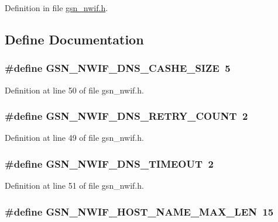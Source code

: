 Definition in file \hyperlink{a00534_source}{gsn\_\-nwif.h}.



\subsection{Define Documentation}
\hypertarget{a00534_af8b27c58acd985898926d6fe0b6cfb3e}{
\subsubsection[{GSN\_\-NWIF\_\-DNS\_\-CASHE\_\-SIZE}]{\setlength{\rightskip}{0pt plus 5cm}\#define GSN\_\-NWIF\_\-DNS\_\-CASHE\_\-SIZE~5}}
\label{a00534_af8b27c58acd985898926d6fe0b6cfb3e}


Definition at line 50 of file gsn\_\-nwif.h.

\hypertarget{a00534_a96d191e78da08d8ea8ae4b6bfee9fb97}{
\subsubsection[{GSN\_\-NWIF\_\-DNS\_\-RETRY\_\-COUNT}]{\setlength{\rightskip}{0pt plus 5cm}\#define GSN\_\-NWIF\_\-DNS\_\-RETRY\_\-COUNT~2}}
\label{a00534_a96d191e78da08d8ea8ae4b6bfee9fb97}


Definition at line 49 of file gsn\_\-nwif.h.

\hypertarget{a00534_ae1cb9c1bbc2f81363b795c9ac1ea048f}{
\subsubsection[{GSN\_\-NWIF\_\-DNS\_\-TIMEOUT}]{\setlength{\rightskip}{0pt plus 5cm}\#define GSN\_\-NWIF\_\-DNS\_\-TIMEOUT~2}}
\label{a00534_ae1cb9c1bbc2f81363b795c9ac1ea048f}


Definition at line 51 of file gsn\_\-nwif.h.

\hypertarget{a00534_adeccef71031ec2c93864f0fbb29198dd}{
\subsubsection[{GSN\_\-NWIF\_\-HOST\_\-NAME\_\-MAX\_\-LEN}]{\setlength{\rightskip}{0pt plus 5cm}\#define GSN\_\-NWIF\_\-HOST\_\-NAME\_\-MAX\_\-LEN~15}}
\label{a00534_adeccef71031ec2c93864f0fbb29198dd}



